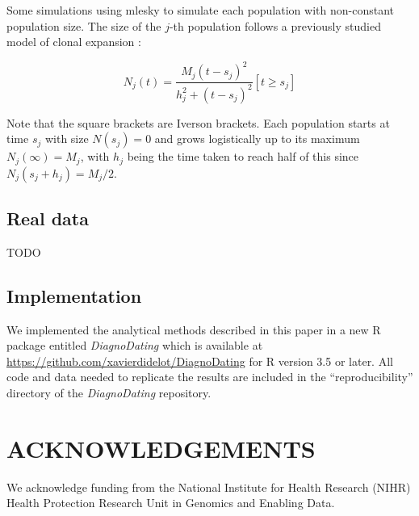 \documentclass{article}
\begin{document}
Some simulations using mlesky \citep{Didelot2023mlesky} to simulate each population with non-constant population size. The size of the $j$-th population follows a previously studied model of clonal expansion \citep{Helekal2021}:

\begin{equation}
N_j(t)=\frac{M_j(t-s_j)^2}{h_j^2+(t-s_j)^2}[t \geq s_j]
\end{equation}

Note that the square brackets are Iverson brackets. Each population starts at time $s_j$ with size $N(s_j)=0$ and grows logistically up to its maximum $N_j(\infty)=M_j$, with $h_j$ being the time taken to reach half of this since $N_j(s_j+h_j)=M_j/2$. 


\subsection*{Real data}

TODO

\subsection*{Implementation}

We implemented the analytical methods described in this paper in a 
new R package entitled \emph{DiagnoDating} which is available
at \url{https://github.com/xavierdidelot/DiagnoDating} for R version 3.5 or later. 
All code and data needed to replicate the results are included in the ``reproducibility'' directory of the \emph{DiagnoDating} repository.

\section*{ACKNOWLEDGEMENTS}

We acknowledge funding from the National Institute for Health Research (NIHR) Health Protection Research Unit in Genomics and Enabling Data.

\newpage


%

\newpage
\setcounter{figure}{0}
\setcounter{table}{0}
\makeatletter 
\renewcommand{\thefigure}{S\@arabic\c@figure} 
\renewcommand{\thetable}{S\@arabic\c@table} 
\makeatother
\end{document}
